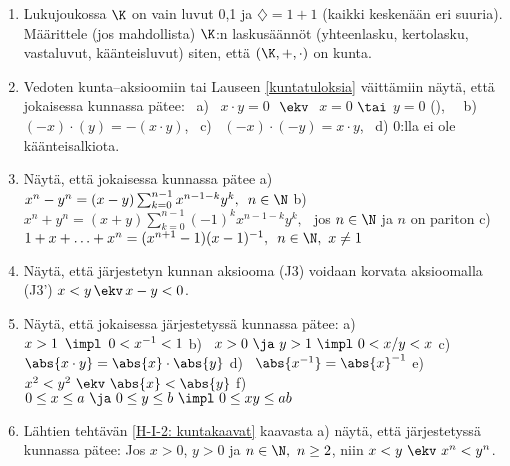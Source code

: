 \Harj
\begin{enumerate}

\item
Lukujoukossa $\K$ on vain luvut 0,1 ja $\diamondsuit=1+1$ (kaikki keskenään eri suuria).
Määrittele (jos mahdollista) $\K$:n laskusäännöt (yhteenlasku, kertolasku, vastaluvut, 
käänteisluvut) siten, että $(\K,+,\cdot)$ on kunta.

\item
{}%
Vedoten kunta--aksioomiin tai Lauseen \ref{kuntatuloksia} väittämiin näytä, että jokaisessa
kunnassa pätee: \ a) \ $x \cdot y = 0$ $\ \ekv\ $ $x=0$ $\tai$ $y=0$
(), \ \ b) \ $(-x)\cdot (y)=-(x\cdot y)$, \ 
c) \ $(-x)\cdot (-y)=x\cdot y$, \ d) $0$:lla ei ole käänteisalkiota.

\item \label{H-I-2: kuntakaavat}
Näytä, että jokaisessa kunnassa pätee \vspace{1mm}\newline
a)\,\ $x^n-y^n = (x-y)\sum_{k=0}^{n-1} x^{n-1-k}y^k,\,\ n\in\N$ \vspace{1mm}\newline
b)\,\ $x^n+y^n = (x+y)\sum_{k=0}^{n-1} (-1)^kx^{n-1-k}y^k,\,\ $ 
      jos $n\in\N$ ja $n$ on pariton \vspace{1mm}\newline
c)\,\ $1+x + \ldots + x^n = (x^{n+1}-1)(x-1)^{-1},\,\ n\in\N,\ x \neq 1$

\item \label{H-I-2: järjestysaksioomat}
Näytä, että järjestetyn kunnan aksiooma (J3) voidaan korvata aksioomalla
(J3') $x<y \,\ekv\, x-y<0$.

\item \label{H-I-2: järjestetyn kunnan väitteitä}
Näytä, että jokaisessa järjestetyssä kunnassa pätee: \newline
a) \ $x>1\,\ \impl\,\ 0 < x^{-1} < 1$ \newline
b) \ $x>0\ \ja\ y>1\ \impl\ 0 < x/y < x$ \vspace{0.2mm}\newline
c) \ $\abs{x \cdot y}=\abs{x}\cdot\abs{y}$ \vspace{0.2mm}\newline
d) \ $\abs{x^{-1}}=\abs{x}^{-1}$ \newline
e) \ $x^2<y^2\ \ekv\ \abs{x} < \abs{y}$ \newline
f) \ $0 \le x \le a\ \ja\ 0 \le y \le b\ \impl\ 0 \le xy \le ab$

\item \label{H-I-2: potenssien järjestys}
Lähtien tehtävän \ref{H-I-2: kuntakaavat} kaavasta a) näytä, että järjestetyssä kunnassa pätee:
Jos $x>0$, $y>0$ ja $n\in\N,\ n \ge 2$, niin $x<y\ \ekv\ x^n<y^n$.


\end{enumerate}
